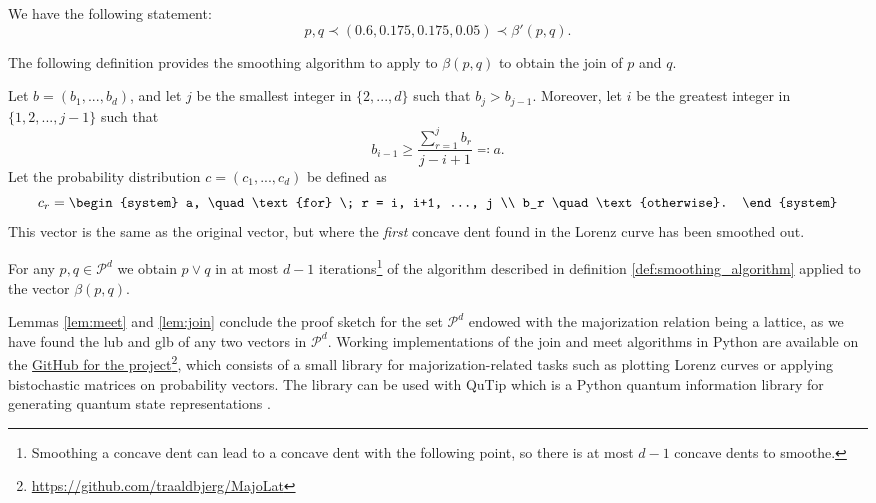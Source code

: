 \noindent We have the following statement:
\begin{equation}
    p, q \prec (0.6, 0.175, 0.175, 0.05) \prec \beta'(p, q).
\end{equation}

\noindent The following definition provides the smoothing algorithm to apply to $\beta(p, q)$ to obtain the join of $p$ and $q$.

\begin{definition} \label{def:smoothing_algorithm}
    Let $b = (b_1, ..., b_d)$, and let $j$ be the smallest integer in $\{2,...,d\}$ such that $b_j > b_{j-1}$. Moreover, let $i$ be the greatest integer in $\{1, 2, ..., j-1\}$ such that
    \begin{equation}
        b_{i-1} \geq \frac{\sum_{r=1}^{j}b_r}{j-i+1} \eqqcolon a.
    \end{equation}
    Let the probability distribution $c = (c_1, ..., c_d)$ be defined as
    \begin{equation}
        c_r = \begin{system}
                a, \quad \text{for} \; r = i, i+1, ..., j \\ %
                b_r \quad \text{otherwise}.
              \end{system}
    \end{equation}
    This vector is the same as the original vector, but where the \textit{first} concave dent found in the Lorenz curve has been smoothed out.
\end{definition}

\begin{lemma} \label{lem:join}
    For any $p, q \in \mathcal{P}^d$ we obtain $p \vee q$ in at most $d-1$ iterations\footnote{Smoothing a concave dent can lead to a concave dent with the following point, so there is at most $d-1$ concave dents to smoothe.} of the algorithm described in definition \ref{def:smoothing_algorithm} applied to the vector $\beta(p, q)$.
\end{lemma}

Lemmas \ref{lem:meet} and \ref{lem:join} conclude the proof sketch for the set $\mathcal{P}^d$ endowed with the majorization relation being a lattice, as we have found the lub and glb of any two vectors in $\mathcal{P}^d$. Working implementations of the join and meet algorithms in Python are available on the \href{https://github.com/traaldbjerg/MajoLat}{GitHub for the project}\footnote{\url{https://github.com/traaldbjerg/MajoLat}}, which consists of a small library for majorization-related tasks such as plotting Lorenz curves or applying bistochastic matrices on probability vectors. The library can be used with QuTip which is a Python quantum information library for generating quantum state representations \cite{johansson_qutip_2012}.


